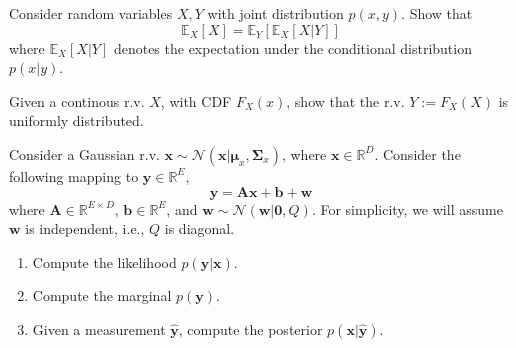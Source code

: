 \begin{question}
\label{q:mml-6.11}

Consider random variables $X,Y$ with joint distribution $p(x,y)$. Show that
\begin{equation}
\mathbb{E}_X[X]= \mathbb{E}_Y[\mathbb{E}_X [X|Y]]
\end{equation}
where $\mathbb{E}_X [X|Y]$ denotes the expectation under the conditional distribution $p(x|y)$.
\end{question}

\begin{question}
\label{q:mml-6.13}

Given a continous r.v. $X$, with CDF $F_X(x)$, show that the r.v. $Y:=F_X(X)$ is uniformly distributed.

\end{question}


\begin{question}
\label{q:mml-6.12}

Consider a Gaussian r.v. $\textbf{x}\sim \mathcal{N}(\textbf{x}|\bm{\mu}_x, \bm{\Sigma}_x)$, where $\textbf{x}\in\mathbb{R}^D$. Consider the following mapping to $\textbf{y}\in\mathbb{R}^E$,
\begin{equation}
\textbf{y} = \textbf{A}\textbf{x} + \textbf{b} + \textbf{w}
\end{equation}
where $\textbf{A}\in\mathbb{R}^{E\times D}$, $\textbf{b}\in\mathbb{R}^E$, and $\textbf{w}\sim \mathcal{N}(\textbf{w}|\textbf{0}, Q)$. For simplicity, we will assume $\textbf{w}$ is independent, i.e., $Q$ is diagonal.
\begin{enumerate}
\item Compute the likelihood $p(\textbf{y}|\textbf{x})$.
\item Compute the marginal $p(\textbf{y})$.
\item Given a measurement $\hat{\textbf{y}}$, compute the posterior $p(\textbf{x}|\hat{\textbf{y}})$.
\end{enumerate}

\end{question}